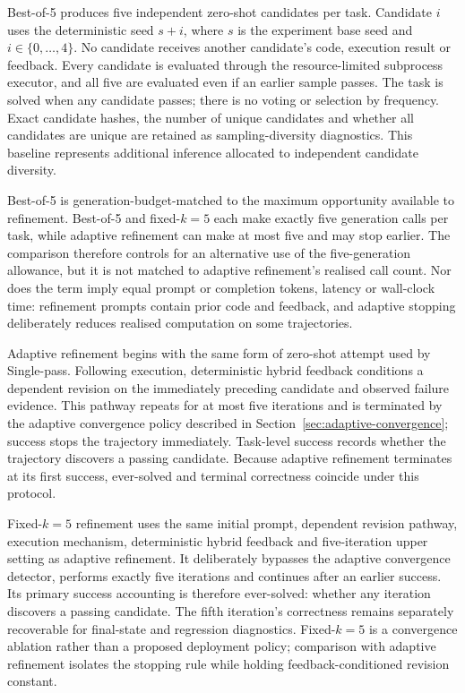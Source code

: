 Best-of-5 produces five independent zero-shot candidates per task. Candidate $i$ uses the deterministic seed $s+i$, where $s$ is the experiment base seed and $i\in\{0,\ldots,4\}$. No candidate receives another candidate's code, execution result or feedback. Every candidate is evaluated through the resource-limited subprocess executor, and all five are evaluated even if an earlier sample passes. The task is solved when any candidate passes; there is no voting or selection by frequency. Exact candidate hashes, the number of unique candidates and whether all candidates are unique are retained as sampling-diversity diagnostics. This baseline represents additional inference allocated to independent candidate diversity.

Best-of-5 is generation-budget-matched to the maximum opportunity available to refinement. Best-of-5 and fixed-$k=5$ each make exactly five generation calls per task, while adaptive refinement can make at most five and may stop earlier. The comparison therefore controls for an alternative use of the five-generation allowance, but it is not matched to adaptive refinement's realised call count. Nor does the term imply equal prompt or completion tokens, latency or wall-clock time: refinement prompts contain prior code and feedback, and adaptive stopping deliberately reduces realised computation on some trajectories.

Adaptive refinement begins with the same form of zero-shot attempt used by Single-pass. Following execution, deterministic hybrid feedback conditions a dependent revision on the immediately preceding candidate and observed failure evidence. This pathway repeats for at most five iterations and is terminated by the adaptive convergence policy described in Section~\ref{sec:adaptive-convergence}; success stops the trajectory immediately. Task-level success records whether the trajectory discovers a passing candidate. Because adaptive refinement terminates at its first success, ever-solved and terminal correctness coincide under this protocol.

Fixed-$k=5$ refinement uses the same initial prompt, dependent revision pathway, execution mechanism, deterministic hybrid feedback and five-iteration upper setting as adaptive refinement. It deliberately bypasses the adaptive convergence detector, performs exactly five iterations and continues after an earlier success. Its primary success accounting is therefore ever-solved: whether any iteration discovers a passing candidate. The fifth iteration's correctness remains separately recoverable for final-state and regression diagnostics. Fixed-$k=5$ is a convergence ablation rather than a proposed deployment policy; comparison with adaptive refinement isolates the stopping rule while holding feedback-conditioned revision constant.

